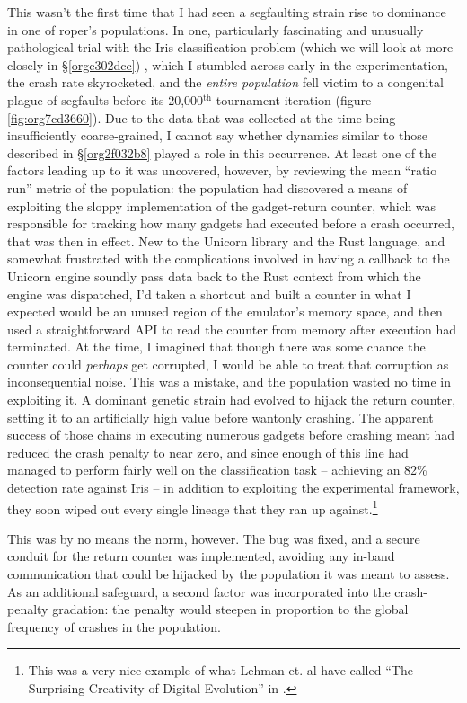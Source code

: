 \documentclass[12pt,glossary]{dalthesis}
\begin{document}
This wasn't the first time that I had seen a segfaulting strain rise to
dominance in one of \gls{roper}'s populations. In one, particularly fascinating
and unusually pathological trial with the Iris classification problem (which we
will look at more closely in \S \ref{orgc302dcc}) , which I stumbled
across early in the experimentation, the crash rate skyrocketed, and the \emph{entire
population} fell victim to a congenital plague of segfaults before its
20,000\(^{\text{th}}\) tournament iteration (figure \ref{fig:org7cd3660}). Due to the data that
was collected at the time being insufficiently coarse-grained, I cannot say
whether dynamics similar to those described in \S \ref{org2f032b8} played
a role in this occurrence. At least one of the factors leading up to it was
uncovered, however, by reviewing the mean ``ratio run'' metric of the population:
the population had discovered a means of exploiting the sloppy implementation of
the gadget-return counter, which was responsible for tracking how many gadgets
had executed before a crash occurred, that was then in effect. New to the
Unicorn library and the Rust language, and somewhat frustrated with the
complications involved in having a callback to the Unicorn engine soundly pass
data back to the Rust context from which the engine was dispatched, I'd taken a
shortcut and built a counter in what I expected would be an unused region of the
emulator's memory space, and then used a straightforward API to read the counter
from memory after execution had terminated. At the time, I imagined that though
there was some chance the counter could \emph{perhaps} get corrupted, I would be able
to treat that corruption as inconsequential noise. This was a mistake, and the
population wasted no time in exploiting it. A dominant genetic strain had
evolved to hijack the return counter, setting it to an artificially high value
before wantonly crashing. The apparent success of those chains in executing
numerous gadgets before crashing meant had reduced the crash penalty to near
zero, and since enough of this line had managed to perform fairly well on the
classification task -- achieving an 82\% detection rate against Iris -- in
addition to exploiting the experimental framework, they soon wiped out every
single lineage that they ran up against.\footnote{This was a very nice example of
what Lehman et. al have called ``The Surprising Creativity of Digital Evolution''
in \cite{lehman18}.}

This was by no means the norm, however. The bug was fixed, and a secure conduit
for the return counter was implemented, avoiding any in-band communication that
could be hijacked by the population it was meant to assess. As an additional
safeguard, a second factor was incorporated into the crash-penalty gradation:
the penalty would steepen in proportion to the global frequency of crashes in
the population. 
\end{document}
